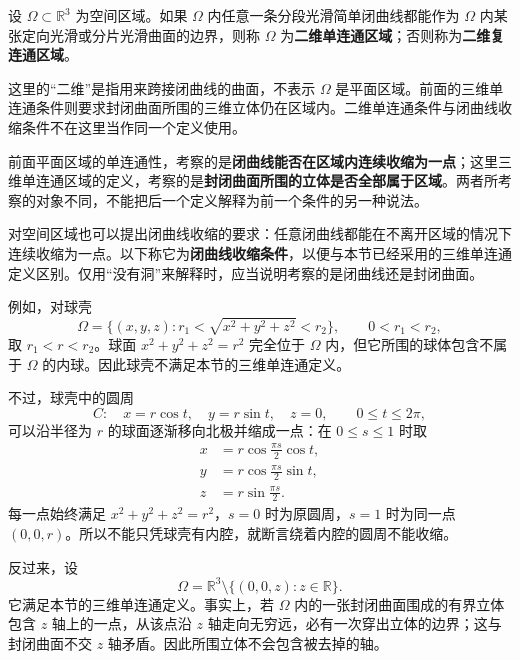 \begin{definition}
设 $\Omega\subset\mathbb R^3$ 为空间区域。如果 $\Omega$ 内任意一条分段光滑简单闭曲线都能作为 $\Omega$ 内某张定向光滑或分片光滑曲面的边界，则称 $\Omega$ 为\textbf{二维单连通区域}；否则称为\textbf{二维复连通区域}。
\end{definition}
这里的“二维”是指用来跨接闭曲线的曲面，不表示 $\Omega$ 是平面区域。前面的三维单连通条件则要求封闭曲面所围的三维立体仍在区域内。二维单连通条件与闭曲线收缩条件不在这里当作同一个定义使用。

\begin{remark}[闭曲线与封闭曲面对应的两种条件]
前面平面区域的单连通性，考察的是\textbf{闭曲线能否在区域内连续收缩为一点}；这里三维单连通区域的定义，考察的是\textbf{封闭曲面所围的立体是否全部属于区域}。两者所考察的对象不同，不能把后一个定义解释为前一个条件的另一种说法。

对空间区域也可以提出闭曲线收缩的要求：任意闭曲线都能在不离开区域的情况下连续收缩为一点。以下称它为\textbf{闭曲线收缩条件}，以便与本节已经采用的三维单连通定义区别。仅用“没有洞”来解释时，应当说明考察的是闭曲线还是封闭曲面。

例如，对球壳
\[
\Omega=\{(x,y,z):r_1<\sqrt{x^2+y^2+z^2}<r_2\},\qquad 0<r_1<r_2,
\]
取 $r_1<r<r_2$。球面 $x^2+y^2+z^2=r^2$ 完全位于 $\Omega$ 内，但它所围的球体包含不属于 $\Omega$ 的内球。因此球壳不满足本节的三维单连通定义。

不过，球壳中的圆周
\[
C:\quad x=r\cos t,\quad y=r\sin t,\quad z=0,\qquad 0\le t\le2\pi,
\]
可以沿半径为 $r$ 的球面逐渐移向北极并缩成一点：在 $0\le s\le1$ 时取
\[
\begin{aligned}
x&=r\cos\frac{\pi s}{2}\cos t,\\
y&=r\cos\frac{\pi s}{2}\sin t,\\
z&=r\sin\frac{\pi s}{2}.
\end{aligned}
\]
每一点始终满足 $x^2+y^2+z^2=r^2$，$s=0$ 时为原圆周，$s=1$ 时为同一点 $(0,0,r)$。所以不能只凭球壳有内腔，就断言绕着内腔的圆周不能收缩。

反过来，设
\[
\Omega=\mathbb R^3\setminus\{(0,0,z):z\in\mathbb R\}.
\]
它满足本节的三维单连通定义。事实上，若 $\Omega$ 内的一张封闭曲面围成的有界立体包含 $z$ 轴上的一点，从该点沿 $z$ 轴走向无穷远，必有一次穿出立体的边界；这与封闭曲面不交 $z$ 轴矛盾。因此所围立体不会包含被去掉的轴。








\end{remark}
